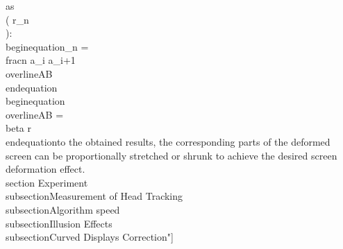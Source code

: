 as \\( r_n \\):\n\n\\begin{equation}\nr_n = \\frac{n a_i a_{i+1}}{\\overline{AB}}\n\\end{equation}\n\nwhere\n\n\\begin{equation}\n\\overline{AB} = \\beta r\n\\end{equation}\n\nAccording to the obtained results, the corresponding parts of the deformed screen can be proportionally stretched or shrunk to achieve the desired screen deformation effect.\n\n\n\\section {Experiment}\n\n\\subsection{Measurement of Head Tracking}\n\n\\subsection{Algorithm speed}\n\\subsection{Illusion Effects}\n\n\n\\subsection{Curved Displays Correction}\n\n\n"]